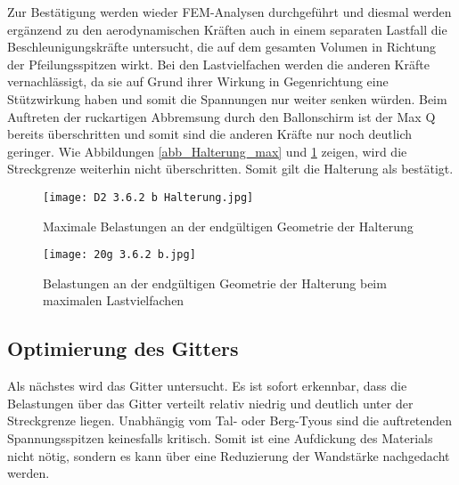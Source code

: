 Zur Bestätigung werden wieder FEM-Analysen durchgeführt und diesmal werden ergänzend zu den aerodynamischen Kräften auch in einem separaten Lastfall die Beschleunigungskräfte untersucht, die auf dem gesamten Volumen in Richtung der Pfeilungsspitzen wirkt. Bei den Lastvielfachen werden die anderen Kräfte vernachlässigt, da sie auf Grund ihrer Wirkung in Gegenrichtung eine Stützwirkung haben und somit die Spannungen nur weiter senken würden. Beim Auftreten der ruckartigen Abbremsung durch den Ballonschirm ist der Max Q bereits überschritten und somit sind die anderen Kräfte nur noch deutlich geringer. Wie Abbildungen \ref{abb_Halterung_max} und \ref{abb_Halterung_20g} zeigen, wird die Streckgrenze weiterhin nicht überschritten. Somit gilt die Halterung als bestätigt.
\begin{figure}[h]
	\begin{minipage}[t]{0.5\linewidth}
		\centering
		\texttt{[image: D2 3.6.2 b Halterung.jpg]}
		\caption{Maximale Belastungen an der endgültigen Geometrie der Halterung}
		\label{abb_Halterung_max}
	\end{minipage}
	\hfill
	\begin{minipage}[t]{0.41\linewidth}
		\centering
		\texttt{[image: 20g 3.6.2 b.jpg]}
		\caption{Belastungen an der endgültigen Geometrie der Halterung beim maximalen Lastvielfachen}
		\label{abb_Halterung_20g}
	\end{minipage}
\end{figure}
\subsection{Optimierung des Gitters}
Als nächstes wird das Gitter untersucht. Es ist sofort erkennbar, dass die Belastungen über das Gitter verteilt relativ niedrig und deutlich unter der Streckgrenze liegen. Unabhängig vom Tal- oder Berg-Tyous sind die auftretenden Spannungsspitzen keinesfalls kritisch. Somit ist eine Aufdickung des Materials nicht nötig, sondern es kann über eine Reduzierung der Wandstärke nachgedacht werden.

